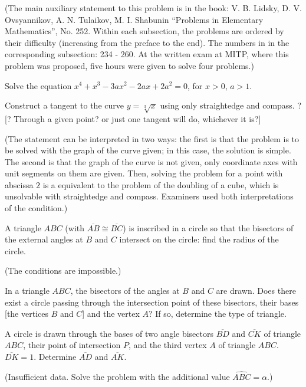 \documentclass{article}
\begin{document}
(The main auxiliary statement to this problem is in the book:
V. B. Lidsky, D. V. Ovsyannikov, A. N. Tulaikov, M. I. Shabunin
``Problems in Elementary Mathematics'', No. 252.
Within each subsection, the problems are ordered by their difficulty (increasing from the preface to the end).
The numbers in in the corresponding subsection: 234 - 260.
At the written exam at MITP, where this problem was proposed, five hours were given to solve four problems.)


\problem[{*}]  %
Solve the equation
$x^4 + x^3 - 3 a x^2 - 2 a x + 2 a^2 = 0$,
for $x > 0$, $a > 1$.


\problem  %
Construct a tangent to the curve $y = \sqrt[3]{x}$
using only straightedge and compass. \newline
?[? Through a given point? or just one tangent will do, whichever it is?]

(The statement can be interpreted in two ways:
the first is that the problem is to be solved with the graph of the curve given;
in this case, the solution is simple.
The second is that the graph of the curve is not given,
only coordinate axes with unit segments on them are given.
Then, solving the problem for a point with abscissa $2$ is a equivalent to the problem of the doubling of a cube,
which is unsolvable with straightedge and compass.
Examiners used both interpretations of the condition.)


\problem  %
A triangle $ABC$ (with $\overline{AB} \cong \overline{BC}$)
is inscribed in a circle so that the bisectors of the external angles at $B$ and $C$ intersect on the circle:
find the radius of the circle.

(The conditions are impossible.)


\problem  %
In a triangle $ABC$, the bisectors of the angles at $B$ and $C$ are drawn.
Does there exist a circle passing through the intersection point of these bisectors,
their bases [the vertices $B$ and $C$] and the vertex $A$?
If so, determine the type of triangle.


\problem  %
A circle is drawn through the bases of two angle bisectors
$\overline{BD}$ and $\overline{CK}$ of triangle $ABC$,
their point of intersection $P$,
and the third vertex $A$ of triangle $ABC$.
$\overline{DK} = 1$.
Determine $\overline{AD}$ and $\overline{AK}$.

(Insufficient data.
Solve the problem with the additional value $\widehat{ABC} = \alpha$.)



\end{document}

